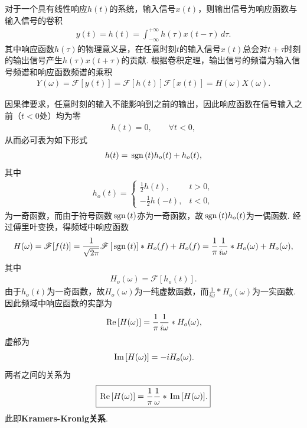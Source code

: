 \documentclass{assignment}
\begin{document}
对于一个具有线性响应$h(t)$的系统，输入信号$x(t)$，则输出信号为响应函数与输入信号的卷积
\begin{align}
    y(t)=h(t)=\int_{-\infty}^{+\infty}h(\tau)x(t-\tau)\,d\tau.
\end{align}
其中响应函数$h(\tau)$的物理意义是，在任意时刻$t$的输入信号$x(t)$总会对$t+\tau$时刻的输出信号产生$h(\tau)x(t+\tau)$的贡献.
根据卷积定理，输出信号的频谱为输入信号频谱和响应函数频谱的乘积
\begin{align}
    Y(\omega)=\mathscr{F}[y(t)]=\mathscr{F}[h(t)]\mathscr{F}[x(t)]=H(\omega)X(\omega).
\end{align}

因果律要求，任意时刻的输入不能影响到之前的输出，因此响应函数在信号输入之前（$t<0$处）均为零
\begin{align}
    h(t)=0,\qquad\forall t<0,
\end{align}
从而必可表为如下形式
\begin{align}
    h(t)=\,\text{sgn}\,(t)h_o(t)+h_o(t),
\end{align}
其中
\begin{align}
    h_o(t)=\left\{\begin{array}{ll}
        \frac{1}{2}h(t),&t>0,\\
        -\frac{1}{2}h(-t),&t<0,
    \end{array}\right.
\end{align}
为一奇函数，而由于符号函数$\,\text{sgn}\,(t)$亦为一奇函数，故$\,\text{sgn}\,(t)h_o(t)$为一偶函数. 经过傅里叶变换，得频域中响应函数
\begin{align}
    H(\omega)=\mathscr{F}[f(t)]=\frac{1}{\sqrt{2\pi}}\mathscr{F}\left[\,\text{sgn}\,(t)\right]*H_o(f)+H_o(f)=\frac{1}{\pi}\frac{1}{i\omega}*H_o(\omega)+H_o(\omega),
\end{align}
其中
\begin{align}
    H_o(\omega)=\mathscr{F}[h_o(t)].
\end{align}
由于$h_o(t)$为一奇函数，故$H_o(\omega)$为一纯虚数函数，而$\frac{1}{i\omega}*H_o(\omega)$为一实函数. 因此频域中响应函数的实部为
\begin{align}
    \,\text{Re}\,[H(\omega)]=\frac{1}{\pi}\frac{1}{i\omega}*H_o(\omega),
\end{align}
虚部为
\begin{align}
    \,\text{Im}\,[H(\omega)]=-iH_o(\omega).
\end{align}
两者之间的关系为
\begin{align}
    \boxed{\,\text{Re}\,[H(\omega)]=\frac{1}{\pi}\frac{1}{\omega}*\,\text{Im}\,[H(\omega)].}
\end{align}
此即\textbf{Kramers-Kronig关系}.
\end{document}
